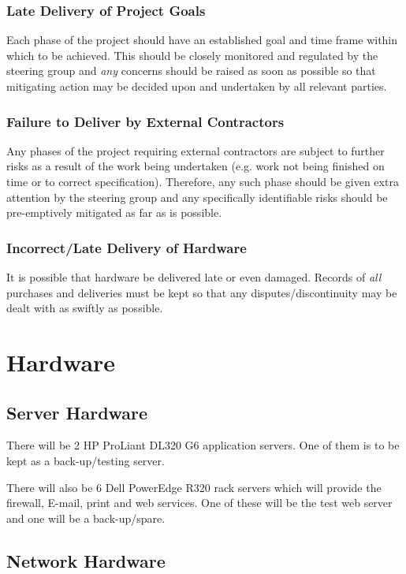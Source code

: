 \documentclass[a4paper, twoside]{article}
\begin{document}
\subsubsection{Late Delivery of Project Goals}
Each phase of the project should have an established goal and time frame within
which to be achieved. This should be closely monitored and regulated by the
steering group and \emph{any} concerns should be raised as soon as possible so
that mitigating action may be decided upon and undertaken by all relevant
parties.

\subsubsection{Failure to Deliver by External Contractors}
Any phases of the project requiring external contractors are subject to further
risks as a result of the work being undertaken (e.g. work not being finished on
time or to correct specification). Therefore, any such phase should be given
extra attention by the steering group and any specifically identifiable risks
should be pre-emptively mitigated as far as is possible.

\subsubsection{Incorrect/Late Delivery of Hardware}
It is possible that hardware be delivered late or even damaged. Records of
\emph{all} purchases and deliveries must be kept so that any
disputes/discontinuity may be dealt with as swiftly as possible.

\section{Hardware}

\subsection{Server Hardware}

There will be 2 HP ProLiant DL320 G6 application servers. One of them is to be
kept as a back-up/testing server.

There will also be 6 Dell PowerEdge R320 rack servers which will provide the
firewall, E-mail, print and web services. One of these will be the test web
server and one will be a back-up/spare.

\subsection{Network Hardware}
\end{document}
